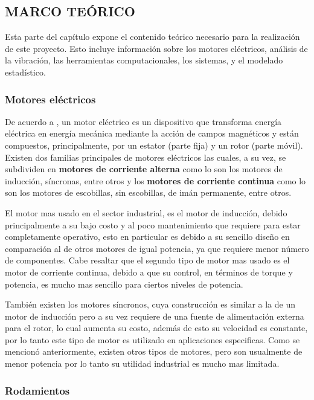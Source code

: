 \subsection{MARCO TEÓRICO}

Esta parte del capítulo expone el contenido teórico necesario para la
realización de este proyecto. Esto incluye información sobre los motores
eléctricos,  análisis de la vibración, las herramientas computacionales, los
sistemas, y el modelado estadístico.



\subsubsection{ Motores eléctricos}

De acuerdo a \Cite{Fraile}, un motor eléctrico es un dispositivo que
transforma energía eléctrica en
energía mecánica mediante la acción de campos magnéticos y están compuestos,
principalmente, por un estator (parte fija) y un rotor (parte móvil).
Existen dos familias principales de motores eléctricos las cuales, a su vez,
se subdividen en \textbf{motores de corriente alterna} como lo son los  motores
de inducción, síncronas, entre otros y los \textbf{motores de corriente continua}
como lo son los motores de escobillas,  sin escobillas, de imán permanente,
entre otros.

El motor mas usado en el sector industrial, es el motor de inducción, debido
principalmente a su bajo costo y al poco mantenimiento que requiere para estar
completamente operativo, esto en particular es debido a su sencillo diseño
en comparación al de otros motores de igual potencia, ya que requiere  menor
número de componentes. Cabe resaltar que el segundo tipo de motor mas usado es
el motor de corriente
continua, debido a que su control, en términos de torque y potencia, es mucho
mas sencillo para ciertos niveles de potencia.

También existen los motores síncronos, cuya construcción es similar a la de un
motor de inducción pero a su vez requiere de una fuente de alimentación externa
para el rotor, lo cual aumenta su costo, además de esto su velocidad es
constante, por lo tanto este tipo de motor es utilizado en aplicaciones
especificas. Como se mencionó anteriormente, existen otros tipos de motores,
pero son usualmente de menor potencia por
lo tanto su utilidad industrial es mucho mas limitada.


\subsubsection*{Rodamientos}

